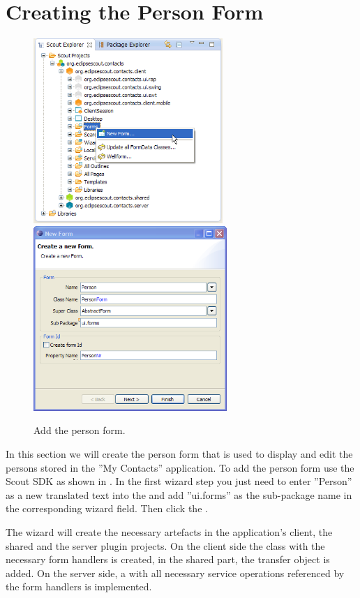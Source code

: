 \documentclass[a4paper,10pt,twoside]{book}
\begin{document}
\section{Creating the Person Form}

\begin{figure}
\includegraphics[height=7cm]{new_form_person_contextmenu.png} \hspace{5mm}
\includegraphics[height=7cm]{new_form_person.png}
\caption{Add the person form.}
\end{figure}

In this section we will create the person form that is used to display and edit the persons stored in the ''My Contacts'' application. 
To add the person form use the Scout SDK  as shown in . 
In the first wizard step you just need to enter ''Person'' as a new translated text into the  and add ''ui.forms'' as the sub-package name in the corresponding wizard field. 
Then click the .

The wizard will create the necessary artefacts in the application's client, the shared and the server plugin projects. 
On the client side the  class with the necessary form handlers is created, in the shared part, the  transfer object is added. 
On the server side, a  with all necessary service operations referenced by the form handlers is implemented. 
\end{document}
